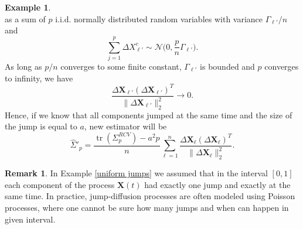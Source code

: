 \documentclass[a4paper,11pt]{book}
\theoremstyle{plain}
\theoremstyle{definition}
\newtheorem{exmp}[thm]{Example}
\newtheorem{rmrk}[thm]{Remark}
\newcommand{\tr}{\operatorname{tr}}
\begin{document}
\begin{exmp}
\[    		\]
    		as a sum of $p$ i.i.d. normally distributed random variables with variance $\Gamma_{\ell'}/n$ and
    		\[ \sum_{j=1}^{p} \Delta X^c_{\ell'} \sim \mathcal{N}\Big(0, \frac{p}{n}\Gamma_{\ell'}\Big). \]
    		As long as $p/n$ converges to some finite constant, $\Gamma_{\ell'}$ is bounded and $p$ converges to infinity, we have
    		\[ 
    		\frac{\Delta \mathbf{X}_{\ell'}(\Delta \mathbf{X}_{\ell'})^T}{\| \Delta \mathbf{X}_{\ell'} \|_2^2} \rightarrow 0.
    		\]
    		Hence, if we know that all components jumped at the same time and the size of the jump is equal to $a$, new estimator will be
    		\[ 
    		\widehat{\Sigma}'_p = \frac{\tr(\Sigma_p^{RCV}) - a^2p}{n} \sum_{\ell=1}^{n} \frac{\Delta \mathbf{X}_{\ell}(\Delta \mathbf{X}_{\ell})^T}{\| \Delta \mathbf{X}_{\ell} \|_2^2}.
    		\]
    \end{exmp}
    
    \begin{rmrk}
    	In Example \ref{uniform jumps} we assumed that in the interval $[0, 1]$ each component of the process $\mathbf{X}(t)$ had exactly one jump and exactly at the same time. In practice, jump-diffusion processes are often modeled using Poisson processes, where one cannot be sure how many jumps and when can happen in given interval.
    \end{rmrk}
    
\end{document}
